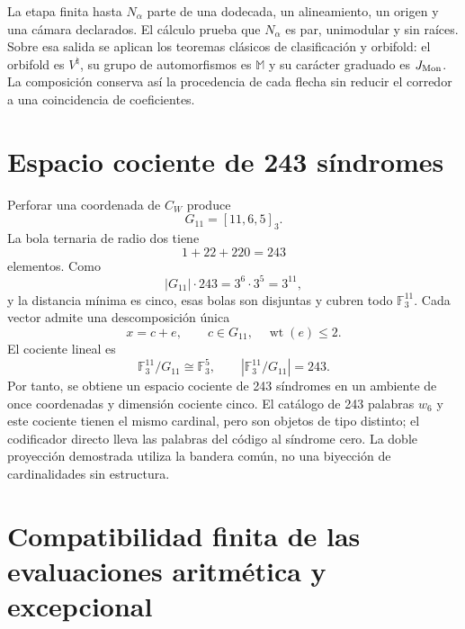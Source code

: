 La etapa finita hasta \(N_\alpha\) parte de una dodecada, un alineamiento, un
origen y una cámara declarados. El cálculo prueba que \(N_\alpha\) es par,
unimodular y sin raíces. Sobre esa salida se aplican los teoremas clásicos de
clasificación y orbifold: el orbifold es \(V^\natural\), su grupo de
automorfismos es \(\mathbb M\) y su carácter graduado es \(J_{\rm Mon}\).
La composición conserva así la procedencia de cada flecha sin reducir el
corredor a una coincidencia de coeficientes.

\section{Espacio cociente de 243 síndromes}

Perforar una coordenada de \(C_W\) produce
\[
G_{11}=[11,6,5]_3.
\]
La bola ternaria de radio dos tiene
\[
1+22+220=243
\]
elementos. Como
\[
|G_{11}|\cdot243=3^6\cdot3^5=3^{11},
\]
y la distancia mínima es cinco, esas bolas son disjuntas y cubren todo
\(\mathbb F_3^{11}\). Cada vector admite una descomposición única
\[
x=c+e,
\qquad
c\in G_{11},
\quad
\operatorname{wt}(e)\le2.
\]
El cociente lineal es
\[
\mathbb F_3^{11}/G_{11}\cong\mathbb F_3^5,
\qquad
|\mathbb F_3^{11}/G_{11}|=243.
\]
Por tanto, se obtiene un espacio cociente de 243 síndromes en un ambiente de once
coordenadas y dimensión cociente cinco. El catálogo de 243 palabras \(w_6\)
y este cociente tienen el mismo cardinal, pero son objetos de tipo distinto;
el codificador directo lleva las palabras del código al síndrome cero. La doble proyección
demostrada utiliza la bandera común, no una biyección de cardinalidades sin
estructura.

\section{Compatibilidad finita de las evaluaciones aritmética y excepcional}

